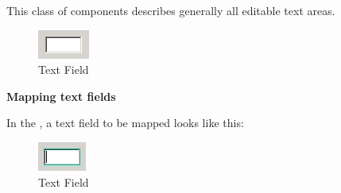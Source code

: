 This class of components describes generally all editable text areas.


\begin{figure}
\begin{center}
\includegraphics{PS/Textfield}
\caption{Text Field}
\label{textfield}
\end{center}
\end{figure}

\textbf{Mapping text fields}

In the \gdomm{}, a text field to be mapped looks like this:

\begin{figure}
\begin{center}
\includegraphics{PS/Maptextfield}
\caption{Text Field}
\label{maptextfield}
\end{center}
\end{figure}
